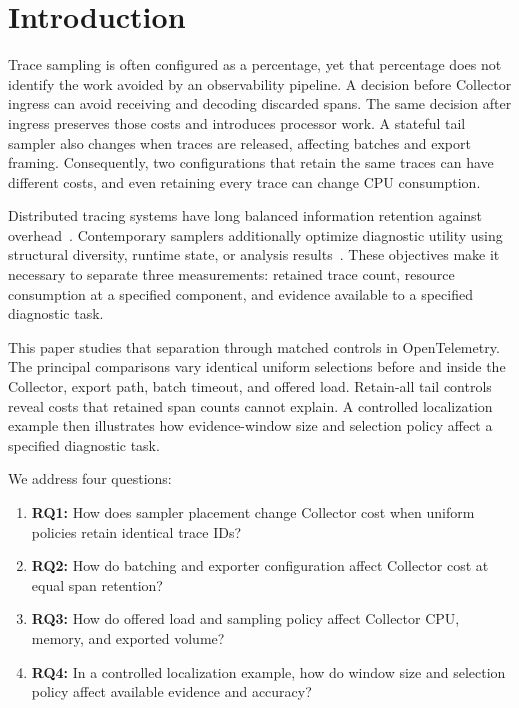 \section{Introduction}\label{sec:introduction}
Trace sampling is often configured as a percentage, yet that percentage does not identify the work avoided by an observability pipeline. A decision before Collector ingress can avoid receiving and decoding discarded spans. The same decision after ingress preserves those costs and introduces processor work. A stateful tail sampler also changes when traces are released, affecting batches and export framing. Consequently, two configurations that retain the same traces can have different costs, and even retaining every trace can change CPU consumption.

Distributed tracing systems have long balanced information retention against overhead~\cite{sigelman2010dapper,kaldor2017canopy}. Contemporary samplers additionally optimize diagnostic utility using structural diversity, runtime state, or analysis results~\cite{lascasas2019sifter,huang2024trastrainer,zhu2025unisage}. These objectives make it necessary to separate three measurements: retained trace count, resource consumption at a specified component, and evidence available to a specified diagnostic task.

This paper studies that separation through matched controls in OpenTelemetry. The principal comparisons vary identical uniform selections before and inside the Collector, export path, batch timeout, and offered load. Retain-all tail controls reveal costs that retained span counts cannot explain. A controlled localization example then illustrates how evidence-window size and selection policy affect a specified diagnostic task.

We address four questions:
\begin{enumerate}
\item \textbf{RQ1:} How does sampler placement change Collector cost when uniform policies retain identical trace IDs?
\item \textbf{RQ2:} How do batching and exporter configuration affect Collector cost at equal span retention?
\item \textbf{RQ3:} How do offered load and sampling policy affect Collector CPU, memory, and exported volume?
\item \textbf{RQ4:} In a controlled localization example, how do window size and selection policy affect available evidence and accuracy?
\end{enumerate}

